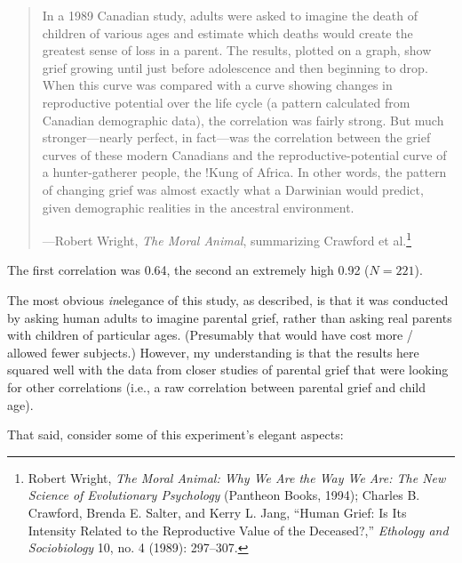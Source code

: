 \begin{quote}

 In a 1989 Canadian study, adults were asked to imagine the death
of children of various ages and estimate which deaths would create the
greatest sense of loss in a parent. The results, plotted on a graph,
show grief growing until just before adolescence and then beginning to
drop. When this curve was compared with a curve showing changes in
reproductive potential over the life cycle (a pattern calculated from
Canadian demographic data), the correlation was fairly strong. But much
stronger---nearly perfect, in fact---was the correlation between the
grief curves of these modern Canadians and the reproductive-potential
curve of a hunter-gatherer people, the !Kung of Africa. In other words,
the pattern of changing grief was almost exactly what a Darwinian would
predict, given demographic realities in the ancestral environment.

{\raggedleft
 {}---Robert Wright, \textit{The Moral Animal},\newline
 summarizing Crawford et al.\footnote{Robert Wright, \textit{The Moral Animal: Why We Are the Way We
Are: The New Science of Evolutionary Psychology} (Pantheon Books,
1994); Charles B. Crawford, Brenda E. Salter, and Kerry L. Jang,
``Human Grief: Is Its Intensity Related to the
Reproductive Value of the Deceased?,''
\textit{Ethology and Sociobiology} 10, no. 4 (1989): 297--307.}
\par}
\end{quote}



 The first correlation was 0.64, the second an extremely high 0.92
($N = 221$).


 The most obvious \textit{in}elegance of this study, as described,
is that it was conducted by asking human adults to imagine parental
grief, rather than asking real parents with children of particular
ages. (Presumably that would have cost more / allowed fewer subjects.)
However, my understanding is that the results here squared well with
the data from closer studies of parental grief that were looking for
other correlations (i.e., a raw correlation between parental grief and
child age).


 That said, consider some of this experiment's
elegant aspects:

